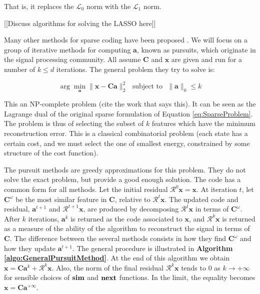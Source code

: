 \documentclass[12pt,a4paper,oneside,english]{UPBThesis}
\begin{document}
That is, it replaces the $\mathcal{L}_0$ norm with the $\mathcal{L}_1$ norm.

[[Discuss algorithms for solving the LASSO here]]

Many other methods for sparse coding have been proposed \cite{undetermined-minimal-L1,sparse-coding-strategy-V1}. We will focus on a group of iterative methods for computing $\textbf{a}$, known as pursuits, which originate in the signal processing community. All assume $\textbf{C}$ and $\textbf{x}$ are given and run for a number of $k \leq d$ iterations. The general problem they try to solve is:

\begin{equation}
\arg\min_\textbf{a} \|\textbf{x} - \textbf{C}\textbf{a}\|_2^2 \text{~~subject to~~} \|\textbf{a}\|_0 \leq k
\end{equation}

This an NP-complete problem (cite the work that says this). It can be seen as the Lagrange dual of the original sparse formulation of Equation \ref{eq:SparseProblem}. The problem is thus of selecting the subset of $k$ features which have the minimum reconstruction error. This is a classical combinatorial problem (each state has a certain cost, and we must select the one of smallest energy, constrained by some structure of the cost function).

The pursuit methods are greedy approximations for this problem. They do not solve the exact problem, but provide a good enough solution. The code has a common form for all methods. Let the initial residual $\mathcal{R}^0\textbf{x} = \textbf{x}$. At iteration $t$, let $\textbf{C}^\omega$ be the most similar feature in $\textbf{C}$, relative to $\mathcal{R}^t\textbf{x}$. The updated code and residual, $\textbf{a}^{t+1}$ and $\mathcal{R}^{t+1}\textbf{x}$, are produced by decomposing $\mathcal{R}^t\textbf{x}$ in terms of $\textbf{C}^\omega$. After $k$ iterations, $\textbf{a}^k$ is returned as the code associated to $\textbf{x}$, and $\mathcal{R}^k\textbf{x}$ is returned as a measure of the ability of the algorithm to reconstruct the signal in terms of $\textbf{C}$. The difference between the several methods consists in how they find $\textbf{C}^\omega$ and how they update $\textbf{a}^{t+1}$. The general procedure is illustrated in \textbf{Algorithm \ref{algo:GeneralPursuitMethod}}. At the end of this algorithm we obtain $\textbf{x} = \textbf{C}\textbf{a}^k + \mathcal{R}^k\textbf{x}$. Also, the norm of the final residual $\mathcal{R}^k\textbf{x}$ tends to $0$ as $k \rightarrow +\infty$ for sensible choices of $\text{\textbf{sim}}$ and $\text{\textbf{next}}$ functions. In the limit, the equality becomes $\textbf{x} = \textbf{C}\textbf{a}^{+\infty}$.
\end{document}
